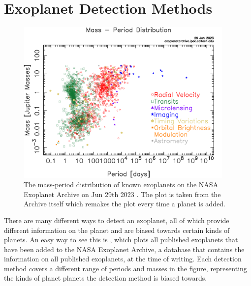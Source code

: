 
\section{Exoplanet Detection Methods}
\label{sec:detection_methods}

\begin{figure}
  \begin{center}
    \includegraphics[width=0.95\textwidth]{intro/exo_massperiod.png}
  \end{center}
  \caption{The mass-period distribution of known exoplanets on the 
  NASA Exoplanet Archive on Jun 29th 2023
  \citep{akesonNASAExoplanet2013}. The plot is taken from the Archive
  itself which remakes the plot every time a planet is added.}
  \label{fig:archive_exoplanet_distribution}
\end{figure}

There are many different ways to detect an exoplanet, all of which provide
different information on the planet and are biased towards certain kinds of
planets. An easy way to see this is ,
which plots all published exoplanets that have been added to the NASA Exoplanet
Archive, a database that contains the information on all published
exoplanets, at the time of writing. Each detection method covers a different
range of periods and masses in the figure, representing the kinds of planet
planets the detection method is biased towards.

